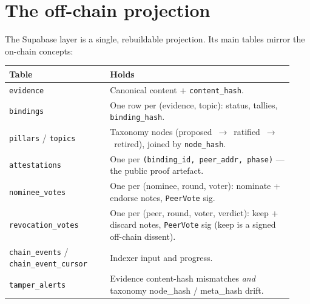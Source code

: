 \documentclass[11pt,a4paper]{article}
\newcommand{\arr}{\ensuremath{\rightarrow}}
\begin{document}
\section{The off-chain projection}

The Supabase layer is a single, rebuildable projection. Its main tables
mirror the on-chain concepts:

\begin{center}
\begin{tabular}{@{}p{0.33\linewidth}p{0.6\linewidth}@{}}
\toprule
\textbf{Table} & \textbf{Holds} \\
\midrule
\texttt{evidence}    & Canonical content + \texttt{content\_hash}. \\
\texttt{bindings}    & One row per (evidence, topic): status, tallies, \texttt{binding\_hash}. \\
\texttt{pillars} / \texttt{topics} & Taxonomy nodes (proposed~\arr~ratified~\arr~retired), joined by \texttt{node\_hash}. \\
\texttt{attestations}& One per \texttt{(binding\_id, peer\_addr, phase)} --- the public proof artefact. \\
\texttt{nominee\_votes}    & One per (nominee, round, voter): nominate + endorse notes, \texttt{PeerVote} sig. \\
\texttt{revocation\_votes} & One per (peer, round, voter, verdict): keep + discard notes, \texttt{PeerVote} sig (keep is a signed off-chain dissent). \\
\texttt{chain\_events} / \texttt{chain\_event\_cursor} & Indexer input and progress. \\
\texttt{tamper\_alerts} & Evidence content-hash mismatches \emph{and} taxonomy node\_hash / meta\_hash drift. \\
\bottomrule
\end{tabular}
\end{center}

\vspace{0.4em}
\end{document}
